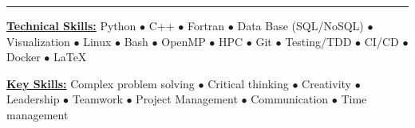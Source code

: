 \vspace*{-10mm}

\begin{center}
    \par\rule{1.0\textwidth}{0.6pt}
\end{center}
\vspace*{-8mm}

\setlength{\columnsep}{6mm}
\begin{multicols}{2}
    \begin{spacing}{1}
        \href{.}{\bf Technical Skills:}
        Python $\bullet$ C++ $\bullet$ Fortran $\bullet$ Data Base (SQL/NoSQL) $\bullet$ Visualization $\bullet$ Linux $\bullet$ Bash $\bullet$ OpenMP $\bullet$ HPC $\bullet$ Git $\bullet$ Testing/TDD $\bullet$ CI/CD $\bullet$ Docker $\bullet$ \LaTeX~ %

        \href{.}{\bf Key Skills:}
        Complex problem solving $\bullet$ Critical thinking $\bullet$ Creativity $\bullet$ Leadership $\bullet$ Teamwork $\bullet$ Project Management $\bullet$ Communication $\bullet$ Time management
    \end{spacing}
\end{multicols}

